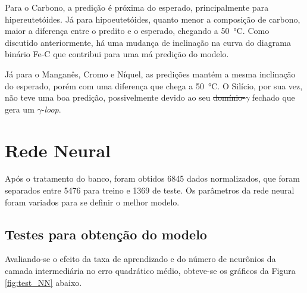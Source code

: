 \documentclass[brazil,tf,epusp]{usp}  %
\providecommand{\DIFadd}[1]{{\protect\color{blue}\uwave{#1}}} %
\providecommand{\DIFdel}[1]{{\protect\color{red}\sout{#1}}}                      %
\providecommand{\DIFaddbegin}{} %
\providecommand{\DIFaddend}{} %
\providecommand{\DIFdelbegin}{} %
\providecommand{\DIFdelend}{} %
\begin{document}
Para o Carbono, a predição é próxima do esperado, principalmente para hipereutetóides. Já para hipoeutetóides, quanto menor a composição de carbono, maior a diferença entre o predito e o esperado, chegando a \SI{50}{\celsius}. Como discutido anteriormente, há uma mudança de inclinação na curva do diagrama binário Fe-C que contribui para uma má predição do modelo.

Já para o Manganês, Cromo e Níquel, as predições mantém a mesma inclinação do esperado, porém com uma diferença que chega a \SI{50}{\celsius}. O Silício, por sua vez, não teve uma boa predição, possivelmente devido ao seu \DIFdelbegin \DIFdel{domínio-}\DIFdelend \DIFaddbegin \DIFadd{domínio }\DIFaddend $\gamma$ fechado que gera um $\gamma$-\textit{loop}.

\section{Rede Neural}
Após o tratamento do banco, foram obtidos 6845 dados normalizados, que foram separados entre 5476 para treino e 1369 de teste. Os parâmetros da rede neural foram variados para se definir o melhor modelo.

\subsection{Testes para obtenção do modelo}

Avaliando-se o efeito da taxa de aprendizado e do número de neurônios da camada intermediária no erro quadrático médio, obteve-se os
gráficos da Figura \ref{fig:test_NN} abaixo.
\end{document}
